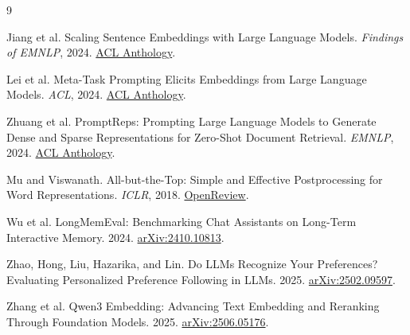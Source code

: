 \documentclass[
  10pt,
  letterpaper,
]{article}
\begin{document}
\begingroup
\small
\begin{thebibliography}{9}
\setlength{\itemsep}{0pt}
\setlength{\parskip}{0pt}

Jiang et al. Scaling Sentence Embeddings with Large Language Models.
\emph{Findings of EMNLP}, 2024.
\href{https://aclanthology.org/2024.findings-emnlp.181/}{ACL Anthology}.

Lei et al. Meta-Task Prompting Elicits Embeddings from Large Language Models.
\emph{ACL}, 2024. \href{https://aclanthology.org/2024.acl-long.546/}{ACL Anthology}.

Zhuang et al. PromptReps: Prompting Large Language Models to Generate Dense and
Sparse Representations for Zero-Shot Document Retrieval.
\emph{EMNLP}, 2024. \href{https://aclanthology.org/2024.emnlp-main.250/}{ACL Anthology}.

Mu and Viswanath. All-but-the-Top: Simple and Effective Postprocessing for Word
Representations.
\emph{ICLR}, 2018. \href{https://openreview.net/forum?id=HkuGJ3kCb}{OpenReview}.

Wu et al. LongMemEval: Benchmarking Chat Assistants on Long-Term Interactive
Memory.
2024. \href{https://arxiv.org/abs/2410.10813}{arXiv:2410.10813}.

Zhao, Hong, Liu, Hazarika, and Lin. Do LLMs Recognize Your Preferences? Evaluating Personalized
Preference Following in LLMs.
2025. \href{https://arxiv.org/abs/2502.09597}{arXiv:2502.09597}.

Zhang et al. Qwen3 Embedding: Advancing Text Embedding and Reranking Through
Foundation Models.
2025. \href{https://arxiv.org/abs/2506.05176}{arXiv:2506.05176}.

\end{thebibliography}
\endgroup
\end{document}
